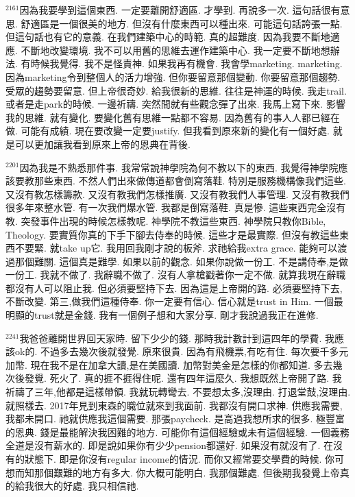\documentclass{book}
\begin{document}
$^{2161}$因為我要學到這個東西.
一定要離開舒適區.
才學到.
再說多一次.
這句話很有意思.
舒適區是一個很美的地方.
但沒有什麼東西可以種出來.
可能這句話誇張一點.
但這句話也有它的意義.
在我們建築中心的時範.
真的超難度.
因為我要不斷地適應.
不斷地改變環境.
我不可以用舊的思維去運作建築中心.
我一定要不斷地想辦法.
有時候我覺得.
我不是怪責神.
如果我再有機會.
我會學marketing.
marketing.
因為marketing令到整個人的活力增強.
但你要留意那個變動.
你要留意那個趨勢.
受眾的趨勢要留意.
但上帝很奇妙.
給我很新的思維.
往往是神運的時候.
我走trail.
或者是走park的時候.
一邊祈禱.
突然間就有些觀念彈了出來.
我馬上寫下來.
影響我的思維.
就有變化.
要變化舊有思維一點都不容易.
因為舊有的事人人都已經在做.
可能有成績.
現在要改變一定要justify.
但我看到原來新的變化有一個好處.
就是可以更加讓我看到原來上帝的恩典在背後.

$^{2201}$因為我是不熟悉那件事.
我常常說神學院為何不教以下的東西.
我覺得神學院應該要教那些東西.
不然人們出來做傳道都會倒寫落鞋.
特別是服務機構像我們這些.
又沒有教怎樣籌款.
又沒有教我們怎樣推廣.
又沒有教我們人事管理.
又沒有教我們很多年來整水管.
有一次我們爆水管.
我都是倒寫落鞋.
真是慘.
這些東西完全沒有教.
突發事件出現的時候怎樣教呢.
神學院不教這些東西.
神學院只教你Bible, Theology.
要實質你真的下手下腳去侍奉的時候.
這些才是最實際.
但沒有教這些東西不要緊.
就take up它.
我用回我剛才說的板斧.
求祂給我extra grace.
能夠可以渡過那個難關.
這個真是難學.
如果以前的觀念.
如果你說做一份工.
不是講侍奉,是做一份工.
我就不做了.
我辭職不做了.
沒有人拿槍戳著你一定不做.
就算我現在辭職都沒有人可以阻止我.
但必須要堅持下去.
因為這是上帝開的路.
必須要堅持下去,不斷改變.
第三,做我們這種侍奉.
你一定要有信心.
信心就是trust in Him.
一個最明顯的trust就是金錢.
我有一個例子想和大家分享.
剛才我說過我正在進修.

$^{2241}$我爸爸離開世界回天家時.
留下少少的錢.
那時我計數計到這四年的學費.
我應該ok的.
不過多去幾次後就發覺.
原來很貴.
因為有飛機票,有吃有住.
每次要千多元加幣.
現在我不是在加拿大讀,是在美國讀.
加幣對美金是怎樣的你都知道.
多去幾次後發覺.
死火了.
真的捱不捱得住呢.
還有四年這麼久.
我想既然上帝開了路.
我祈禱了三年,他都是這樣帶領.
我就玩轉彎去.
不要想太多,沒理由.
打退堂鼓,沒理由.
就照樣去.
2017年見到東森的職位就來到我面前.
我都沒有開口求神.
供應我需要,我都未開口.
祂就供應我這個需要.
那張paycheck.
是高過我想所求的很多.
極豐富的恩典.
錢是最能解決我困難的地方.
可能你有這個經驗或未有這個經驗.
一個義務全道是沒有薪水的.
即是說如果你有少少pension都還好.
如果沒有就沒有了.
在沒有的狀態下.
即是你沒有regular income的情況.
而你又經常要交學費的時候.
你可想而知那個艱難的地方有多大.
你大概可能明白.
我那個難處.
但後期我發覺上帝真的給我很大的好處.
我只相信祂.
\end{document}
